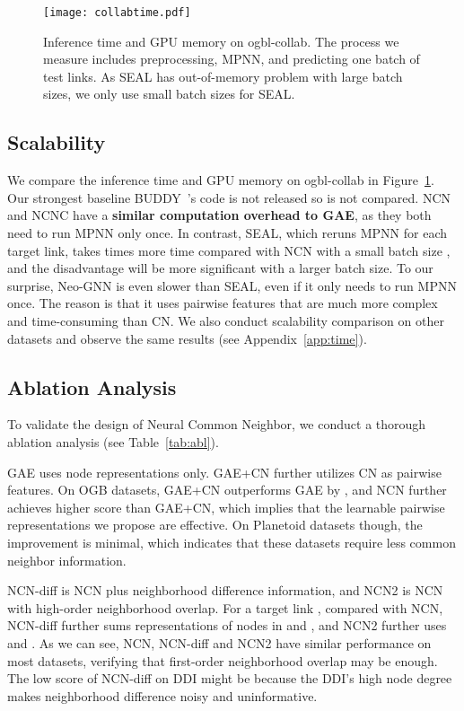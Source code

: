 \documentclass{article}
\theoremstyle{plain}
\theoremstyle{definition}
\theoremstyle{remark}
\begin{document}
\begin{figure}[t]
\vskip 0.05in
    \centering
    \texttt{[image: collabtime.pdf]}
    \vskip -0.05in
    \caption{Inference time and GPU memory on ogbl-collab. The process we measure includes preprocessing, MPNN, and predicting one batch of test links. As SEAL has out-of-memory problem with large batch sizes, we only use small batch sizes for SEAL.}\label{fig:time}
\vskip -0.25in
\end{figure}
\subsection{Scalability}\label{sec:scalability}
We compare the inference time and GPU memory on ogbl-collab in Figure~\ref{fig:time}. Our strongest baseline BUDDY~\citep{Gsketch}'s code is not released so is not compared. NCN and NCNC have a \textbf{similar computation overhead to GAE}, as they both need to run MPNN only once. In contrast, SEAL, which reruns MPNN for each target link, takes  times more time compared with NCN with a small batch size , and the disadvantage will be more significant with a larger batch size. To our surprise, Neo-GNN is even slower than SEAL, even if it only needs to run MPNN once. The reason is that it uses pairwise features that are much more complex and time-consuming than CN. We also conduct scalability comparison on other datasets and observe the same results (see Appendix~\ref{app:time}).

\subsection{Ablation Analysis}\label{sec::abl}
To validate the design of Neural Common Neighbor, we conduct a thorough ablation analysis (see Table~\ref{tab:abl}). 

GAE uses node representations only. GAE+CN further utilizes CN as pairwise features. On OGB datasets, GAE+CN outperforms GAE by , and NCN further achieves  higher score than GAE+CN, which implies that the learnable pairwise representations we propose are effective. On Planetoid datasets though, the improvement is minimal, which indicates that these datasets require less common neighbor information. 

NCN-diff is NCN plus neighborhood difference information, and NCN2 is NCN with high-order neighborhood overlap. For a target link , compared with NCN, NCN-diff further sums representations of nodes in  and , and NCN2 further uses  and . As we can see, NCN, NCN-diff and NCN2 have similar performance on most datasets, verifying that first-order neighborhood overlap may be enough. The low score of NCN-diff on DDI might be because the DDI's high node degree makes neighborhood difference noisy and uninformative.
\end{document}
